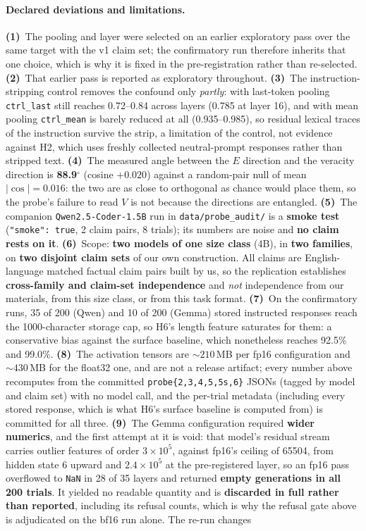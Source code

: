 \paragraph{Declared deviations and limitations.} \textbf{(1)}~The pooling and layer were selected on an earlier exploratory pass over the same target with the v1 claim set; the confirmatory run therefore inherits that one choice, which is why it is fixed in the pre-registration rather than re-selected. \textbf{(2)}~That earlier pass is reported as exploratory throughout. \textbf{(3)}~The instruction-stripping control removes the confound only \emph{partly}: with last-token pooling \texttt{ctrl\_last} still reaches 0.72--0.84 across layers (0.785 at layer 16), and with mean pooling \texttt{ctrl\_mean} is barely reduced at all (0.935--0.985), so residual lexical traces of the instruction survive the strip, a limitation of the control, not evidence against H2, which uses freshly collected neutral-prompt responses rather than stripped text. \textbf{(4)}~The measured angle between the $E$ direction and the veracity direction is \textbf{88.9$^\circ$} (cosine $+0.020$) against a random-pair null of mean $|\cos|\!=\!0.016$: the two are as close to orthogonal as chance would place them, so the probe's failure to read $V$ is not because the directions are entangled. \textbf{(5)}~The companion \texttt{Qwen2.5-Coder-1.5B} run in \texttt{data/probe\_audit/} is a \textbf{smoke test} (\texttt{"smoke": true}, 2 claim pairs, 8 trials); its numbers are noise and \textbf{no claim rests on it}. \textbf{(6)}~Scope: \textbf{two models of one size class} (4B), in \textbf{two families}, on \textbf{two disjoint claim sets} of our own construction. All claims are English-language matched factual claim pairs built by us, so the replication establishes \textbf{cross-family and claim-set independence} and \emph{not} independence from our materials, from this size class, or from this task format. \textbf{(7)}~On the confirmatory runs, 35 of 200 (Qwen) and 10 of 200 (Gemma) stored instructed responses reach the 1000-character storage cap, so H6's length feature saturates for them: a conservative bias against the surface baseline, which nonetheless reaches 92.5\% and 99.0\%. \textbf{(8)}~The activation tensors are ${\sim}210$\,MB per fp16 configuration and ${\sim}430$\,MB for the float32 one, and are not a release artifact; every number above recomputes from the committed \texttt{probe\{2,3,4,5,5s,6\}} JSONs (tagged by model and claim set) with no model call, and the per-trial metadata (including every stored response, which is what H6's surface baseline is computed from) is committed for all three. \textbf{(9)}~The Gemma configuration required \textbf{wider numerics}, and the first attempt at it is void: that model's residual stream carries outlier features of order $3\!\times\!10^{5}$, against fp16's ceiling of 65504, from hidden state 6 upward and $2.4\!\times\!10^{5}$ at the pre-registered layer, so an fp16 pass overflowed to \texttt{NaN} in 28 of 35 layers and returned \textbf{empty generations in all 200 trials}. It yielded no readable quantity and is \textbf{discarded in full rather than reported}, including its refusal counts, which is why the refusal gate above is adjudicated on the bf16 run alone. The re-run changes 